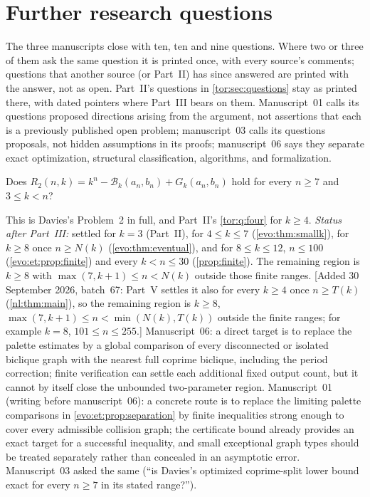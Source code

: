 \documentclass[11pt,a4paper]{article}
\numberwithin{equation}{section}
\theoremstyle{definition}
\theoremstyle{remark}
\newcommand{\Bip}{\mathcal B}
\begin{document}
\section{Further research questions}\label{evo:sec:questions}

The three manuscripts close with ten, ten and nine questions. Where two or
three of them ask the same question it is printed once, with every source's
comments; questions that another source (or Part~II) has since answered are
printed with the answer, not as open. Part~II's questions in
\cref{tor:sec:questions} stay as printed there, with dated pointers where
Part~III bears on them. Manuscript~01 calls its questions proposed directions
arising from the argument, not assertions that each is a previously
published open problem; manuscript~03 calls its questions proposals, not
hidden assumptions in its proofs; manuscript~06 says they separate exact
optimization, structural classification, algorithms, and formalization.

\begin{question}\label{evo:q:complete}
Does $R_2(n,k)=k^n-\Bip_k(a_n,b_n)+G_k(a_n,b_n)$ hold for every $n\ge7$ and
$3\le k<n$?
\end{question}
This is Davies's Problem~2 in full, and Part~II's \cref{tor:q:four} for
$k\ge4$. \emph{Status after Part~III:} settled for $k=3$ (Part~II), for
$4\le k\le7$ (\cref{evo:thm:smallk}), for $k\ge8$ once $n\ge N(k)$
(\cref{evo:thm:eventual}), and for $8\le k\le12$, $n\le100$
(\cref{evo:et:prop:finite}) and every $k<n\le30$ (\cref{prop:finite}). The
remaining region is $k\ge8$ with $\max(7,k+1)\le n<N(k)$ outside those finite
ranges. [Added 30 September 2026, batch~67: Part~V settles it also for every $k\ge4$ once
$n\ge T(k)$ (\cref{nl:thm:main}), so the remaining region is $k\ge8$,
$\max(7,k+1)\le n<\min(N(k),T(k))$ outside the finite ranges; for example
$k=8$, $101\le n\le255$.] Manuscript~06: a direct target is to replace the palette estimates by
a global comparison of every disconnected or isolated biclique graph with the
nearest full coprime biclique, including the period correction; finite
verification can settle each additional fixed output count, but it cannot by
itself close the unbounded two-parameter region. Manuscript~01 (writing
before manuscript~06): a concrete route is to replace the limiting palette
comparisons in \cref{evo:et:prop:separation} by finite inequalities strong
enough to cover every admissible collision graph; the certificate bound
already provides an exact target for a successful inequality, and small
exceptional graph types should be treated separately rather than concealed in
an asymptotic error. Manuscript~03 asked the same (``is Davies's optimized
coprime-split lower bound exact for every $n\ge7$ in its stated range?'').
\end{document}
